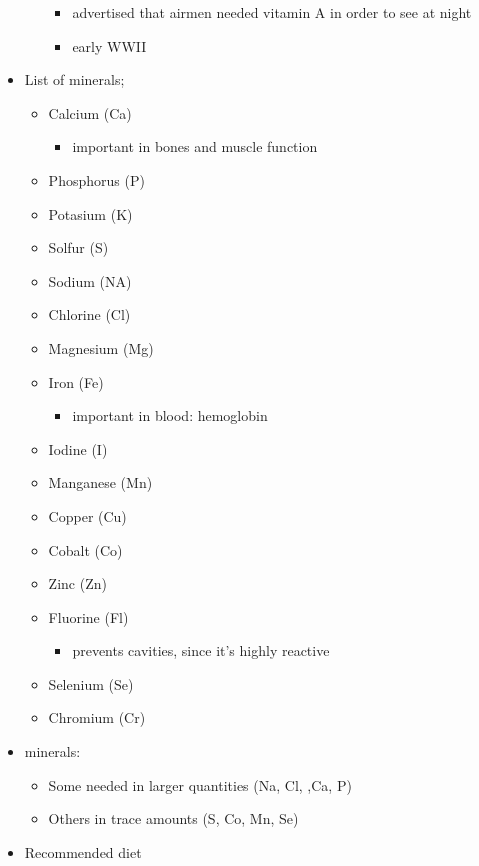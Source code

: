 \documentclass{article}
\theoremstyle{definition}
\begin{document}
\begin{itemize}
\begin{itemize}
				\begin{itemize}
					\item advertised that airmen needed vitamin A in order to see at night
					\item early WWII
				\end{itemize}
		\end{itemize}
	\item List of minerals;
		\begin{itemize}
			\item Calcium (Ca)
				\begin{itemize}
					\item important in bones and muscle function
				\end{itemize}
			\item Phosphorus (P)
			\item Potasium (K)
			\item Solfur (S)
			\item Sodium (NA)
			\item Chlorine (Cl)
			\item Magnesium (Mg)
			\item Iron (Fe)
				\begin{itemize}
					\item important in blood: hemoglobin
				\end{itemize}
			\item Iodine (I)
			\item Manganese (Mn)
			\item Copper (Cu)
			\item Cobalt (Co)
			\item Zinc (Zn)
			\item Fluorine (Fl)
				\begin{itemize}
					\item prevents cavities, since it's highly reactive
				\end{itemize}
			\item Selenium (Se)
			\item Chromium (Cr)
		\end{itemize}
	\item minerals:
		\begin{itemize}
			\item Some needed in larger quantities (Na, Cl, ,Ca, P)
			\item Others in trace amounts (S, Co, Mn, Se)
		\end{itemize}
	\item Recommended diet
		\begin{itemize}

\end{itemize}
\end{itemize}
\end{document}
